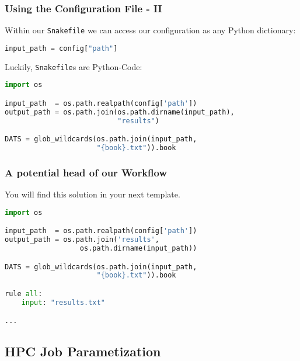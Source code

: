 \begingroup
{}
\begin{frame}[fragile]
  \frametitle{Using the Configuration File - II}
  Within our \texttt{Snakefile} we can access our configuration as any Python dictionary:
  \begin{lstlisting}[language=Python,style=Python]
input_path = config["path"]
  \end{lstlisting}
  \pause
  Luckily, \texttt{Snakefile}s are Python-Code:
  \begin{lstlisting}[language=Python,style=Python]
import os

input_path  = os.path.realpath(config['path'])
output_path = os.path.join(os.path.dirname(input_path),
                           "results")

DATS = glob_wildcards(os.path.join(input_path, 
                      "{book}.txt")).book
  \end{lstlisting}
\end{frame}
\endgroup

\begin{frame}[fragile]
  \frametitle{A potential head of our Workflow}
  You will find this solution in your next template.
  \begin{lstlisting}[language=Python,style=Python, basicstyle=\small]
import os

input_path  = os.path.realpath(config['path'])
output_path = os.path.join('results', 
                  os.path.dirname(input_path))

DATS = glob_wildcards(os.path.join(input_path, 
                      "{book}.txt")).book

rule all:
    input: "results.txt"

...
  \end{lstlisting}
\end{frame}

\subsection{HPC Job Parametization}

